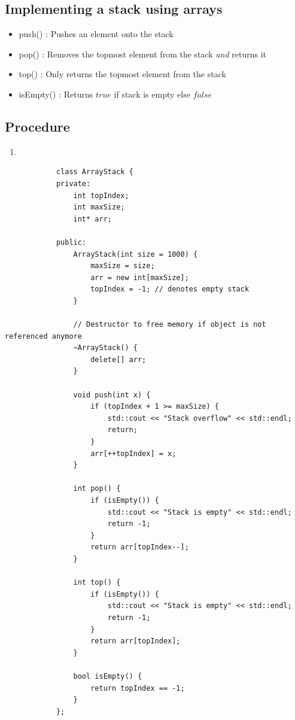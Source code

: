 \documentclass[a4paper, 12pt]{book}
\begin{document}
	\subsection{Implementing a stack using arrays} 
	
	\begin{itemize}
		\item push() : Pushes an element onto the stack
		\item pop() : Removes the topmost element from the stack \emph{and} returns it
		\item {top()} : Only returns the topmost element from the stack 
		\item {isEmpty()} : Returns $true$ if stack is empty else $false$
	\end{itemize}
	\vspace{\baselineskip}
	\subsection{Procedure}
	\begin{enumerate}
		\item 
	\end{enumerate}
	\newpage
	
	\begin{tcolorbox}[title=ArrayStack class]
		\begin{verbatim}
			class ArrayStack {
			private:
				int topIndex;
				int maxSize;
				int* arr;
				
			public:
				ArrayStack(int size = 1000) {
					maxSize = size;
					arr = new int[maxSize];
					topIndex = -1; // denotes empty stack
				}
				
				// Destructor to free memory if object is not referenced anymore
				~ArrayStack() {
					delete[] arr;
				}
				
				void push(int x) {
					if (topIndex + 1 >= maxSize) {
						std::cout << "Stack overflow" << std::endl;
						return;
					}
					arr[++topIndex] = x;
				}
				
				int pop() {
					if (isEmpty()) {
						std::cout << "Stack is empty" << std::endl;
						return -1;
					}
					return arr[topIndex--];
				}
				
				int top() {
					if (isEmpty()) {
						std::cout << "Stack is empty" << std::endl;
						return -1;
					}
					return arr[topIndex];
				}
				
				bool isEmpty() {
					return topIndex == -1;
				}
			};
		\end{verbatim}
	\end{tcolorbox}
	
\end{document}
